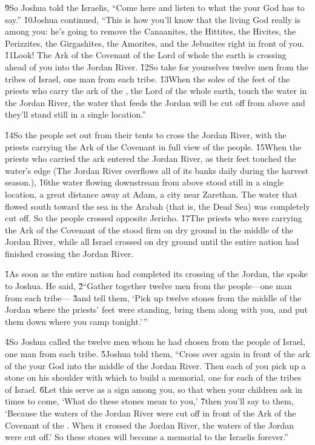 \v{9}So Joshua told the Israelis, ``Come here and listen to what the  your God has to say.'' \v{10}Joshua continued, ``This is how you'll know that the living God really is among you: he's going to remove the Canaanites, the Hittites, the Hivites, the Perizzites, the Girgashites, the Amorites, and the Jebusites right in front of you. \v{11}Look! The Ark of the Covenant of the Lord of whole the earth is crossing ahead of you into the Jordan River. \v{12}So take for yourselves twelve men from the tribes of Israel, one man from each tribe. \v{13}When the soles of the feet of the priests who carry the ark of the , the Lord of the whole earth, touch the water in the Jordan River, the water that feeds the Jordan will be cut off from above and they'll stand still in a single location.''

\v{14}So the people set out from their tents to cross the Jordan River, with the priests carrying the Ark of the Covenant in full view of the people. \v{15}When the priests who carried the ark entered the Jordan River, as their feet touched the water's edge (The Jordan River overflows all of its banks daily during the harvest season.), \v{16}the water flowing downstream from above stood still in a single location, a great distance away at Adam, a city near Zarethan. The water that flowed south toward the sea in the Arabah (that is, the Dead Sea) was completely cut off. So the people crossed opposite Jericho. \v{17}The priests who were carrying the Ark of the Covenant of the  stood firm on dry ground in the middle of the Jordan River, while all Israel crossed on dry ground until the entire nation had finished crossing the Jordan River.

\v{1}As soon as the entire nation had completed its crossing of the Jordan, the  spoke to Joshua. He said, \v{2}``Gather together twelve men from the people---one man from each tribe--- \v{3}and tell them, `Pick up twelve stones from the middle of the Jordan where the priests' feet were standing, bring them along with you, and put them down where you camp tonight.'\,''

\v{4}So Joshua called the twelve men whom he had chosen from the people of Israel, one man from each tribe. \v{5}Joshua told them, ``Cross over again in front of the ark of the  your God into the middle of the Jordan River. Then each of you pick up a stone on his shoulder with which to build a memorial, one for each of the tribes of Israel. \v{6}Let this serve as a sign among you, so that when your children ask in times to come, `What do these stones mean to you,' \v{7}then you'll say to them, `Because the waters of the Jordan River were cut off in front of the Ark of the Covenant of the . When it crossed the Jordan River, the waters of the Jordan were cut off.' So these stones will become a memorial to the Israelis forever.''

